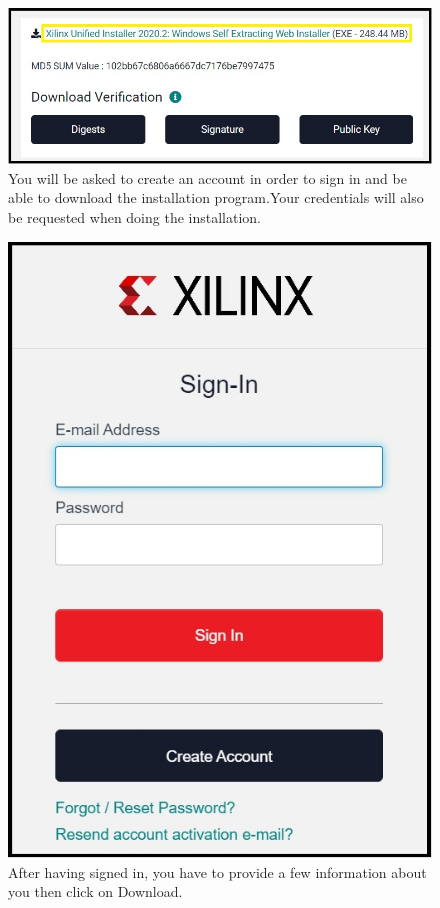 \begin{figure}[H]
\centering
  \includegraphics[width=0.8\linewidth]{images/VivadoInstimg003.jpg}
  \captionsetup{width=0.8\linewidth}
  \caption{You will be asked to create an account in order to sign in and be able to download the installation program.Your credentials will also be requested when doing the installation.}
  \label{fig:VivadoInstimg003}
\end{figure}

\begin{figure}[H]
\centering
  \includegraphics[width=0.8\linewidth]{images/VivadoInstimg004.jpg}
  \captionsetup{width=0.8\linewidth}
  \caption{After having signed in, you have to provide a few information about you then click on Download.}
  \label{fig:VivadoInstimg004}
\end{figure}


